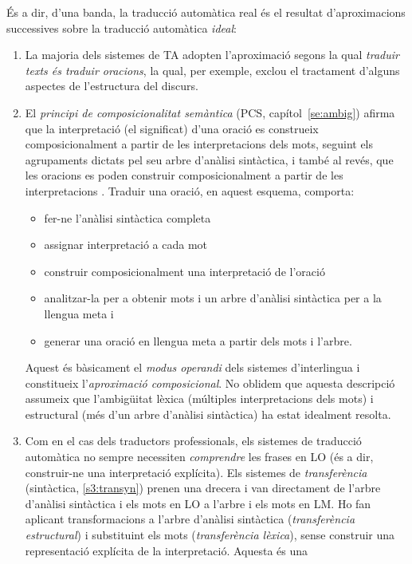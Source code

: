 És a dir, d'una banda, la traducció automàtica real és el resultat
d'aproximacions successives sobre la traducció automàtica \emph{ideal}:
\begin{enumerate}
\item La majoria dels sistemes de TA adopten l'aproximació segons la
  qual \emph{traduir texts és traduir oracions}, la qual, per exemple,
  exclou el tractament d'alguns aspectes de l'estructura del discurs.
\item El \emph{principi de composicionalitat semàntica} (PCS,
  capítol~\ref{se:ambig}) afirma que la interpretació (el significat)
  d'una oració es construeix composicionalment a partir de les
  interpretacions dels mots, seguint els agrupaments dictats pel seu
  arbre d'anàlisi sintàctica, i també al revés, que les oracions es
  poden construir composicionalment a partir de les interpretacions
  \citep{tellier00p}. Traduir una oració, en aquest esquema, comporta:
  \begin{itemize}
  \item fer-ne l'anàlisi sintàctica completa
  \item assignar interpretació a cada mot
  \item construir composicionalment una interpretació de l'oració
  \item analitzar-la per a obtenir mots i un arbre d'anàlisi
    sintàctica per a la llengua meta i
  \item generar una oració en llengua meta a partir dels mots i
    l'arbre.
  \end{itemize}
  Aquest és bàsicament el \emph{modus
    operandi} dels sistemes d'interlingua i constitueix
    l'\emph{aproximació composicional}. No oblidem que aquesta
    descripció assumeix que l'ambigüitat lèxica (múltiples
    interpretacions dels mots) i estructural (més d'un arbre d'anàlisi
    sintàctica) ha estat
    idealment resolta.
\item Com en el cas dels traductors professionals, els sistemes de
  traducció automàtica no sempre necessiten \emph{comprendre} les
  frases en LO
  (és a dir, construir-ne una interpretació explícita). Els sistemes
  de \emph{transferència} (sintàctica, \ref{s3:transyn}) prenen una drecera i van directament de
  l'arbre d'anàlisi sintàctica i els mots en LO a l'arbre i els mots
  en LM. Ho fan aplicant transformacions a l'arbre d'anàlisi
  sintàctica (\emph{transferència estructural})  i substituint els
  mots (\emph{transferència lèxica}), sense  construir una
  representació explícita de la interpretació. Aquesta és una

\end{enumerate}
